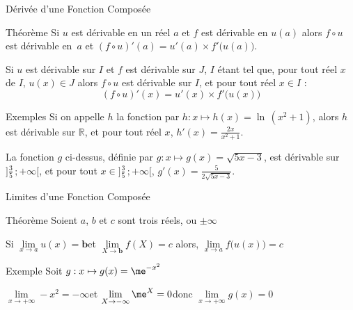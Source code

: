\documentclass{cours}
\begin{document}
    \begin{Gpartie}{Dérivée d'une Fonction Composée} 
        \begin{Spartie}{Théorème} 
            Si $u$ est dérivable en un réel $a$ et $f$ est dérivable en $u(a)$ alors $f\circ u$ est dérivable en~$a$ et $(f\circ u)'(a)=u'(a)\times f'\big(u(a)\big)$.

            Si $u$ est dérivable sur $I$ et $f$ est dérivable sur $J$, $I$ étant tel que, pour tout réel $x$ de $I$, $u(x)\in J$ alors $f\circ u$ est dérivable sur $I$, et pour tout réel $x\in I$ : \[\boxed{(f\circ u)'(x)=u'(x)\times f'\big(u(x)\big)}\] 
        \end{Spartie}
        \begin{Spartie}{Exemples} 
            Si on appelle $h$ la fonction par $h:x\mapsto h(x)=\ln\,(x^2+1)$, alors $h$ est dérivable sur $\mathbb{R}$, et pour tout réel $x$, $h'(x)=\frac{2x}{x^2+1}$.

            La fonction $g$ ci-dessus, définie par $g:x\mapsto g(x)=\sqrt{5x-3}$, est dérivable sur~$\Big]\frac{3}{5}\,;+\infty\Big[$, et pour tout $x\in\Big]\frac{3}{5}\,;+\infty\Big[$, $g'(x)=\frac{5}{2\sqrt{5x-3}}$.
        \end{Spartie}
    \end{Gpartie}
    \begin{Gpartie}{Limites d'une Fonction Composée} 
        \begin{Spartie}{Théorème} 
            Soient $a$, $b$ et $c$ sont trois réels, ou $\pm\infty$

            Si \qquad$\lim\limits_{x\to a}u(x)=\boldsymbol{b}$\qquad et \qquad $\lim\limits_{X\to \boldsymbol{b}}f(X)=c$ \qquad alors, \qquad $\boxed{\lim\limits_{x\to a}f\big(u(x)\big)=c}$
        \end{Spartie}
        \begin{Spartie}{Exemple} 
            Soit $g:x\mapsto g(x)=\me^{-x^2}$

            $\lim\limits_{x\to +\infty} -x^2=-\infty$\qquad et \qquad$\lim\limits_{X\to -\infty} \me^X=0$\qquad donc \qquad$\lim\limits_{x\to +\infty}g(x)=0$
        \end{Spartie}
    \end{Gpartie}
\end{document}
